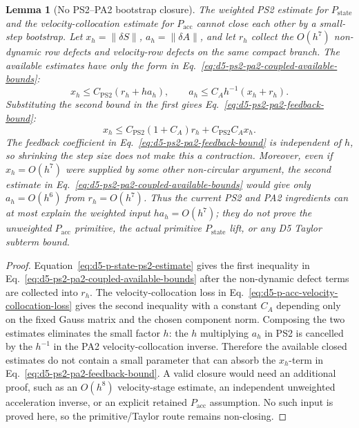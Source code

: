 \documentclass[preprint,12pt]{elsarticle}
\newtheorem{lemma}{Lemma}
\begin{document}
\begin{lemma}[No PS2--PA2 bootstrap closure]
\label{lem:d5-p-state-pacc-bootstrap-nonclosure}
The weighted PS2 estimate for \(P_{\mathrm{state}}\) and the
velocity-collocation estimate for \(P_{\mathrm{acc}}\) cannot close each
other by a small-step bootstrap.  Let
\(x_h=\|\delta S\|\), \(a_h=\|\delta A\|\), and let
\(r_h\) collect the \(O(h^7)\) non-dynamic row defects and velocity-row
defects on the same compact branch.  The available estimates have only the
form in Eq.~\eqref{eq:d5-ps2-pa2-coupled-available-bounds}:
\begin{equation}
\label{eq:d5-ps2-pa2-coupled-available-bounds}
  x_h\le C_{\mathrm{PS2}}(r_h+h a_h),
  \qquad
  a_h\le C_A h^{-1}(x_h+r_h).
\end{equation}
Substituting the second bound in the first gives
Eq.~\eqref{eq:d5-ps2-pa2-feedback-bound}:
\begin{equation}
\label{eq:d5-ps2-pa2-feedback-bound}
  x_h\le C_{\mathrm{PS2}}(1+C_A)r_h
       +C_{\mathrm{PS2}}C_A x_h .
\end{equation}
The feedback coefficient in Eq.~\eqref{eq:d5-ps2-pa2-feedback-bound} is
independent of \(h\), so shrinking the step size does not make this a
contraction.  Moreover, even if \(x_h=O(h^7)\) were supplied by some other
non-circular argument, the second estimate in
Eq.~\eqref{eq:d5-ps2-pa2-coupled-available-bounds} would give only
\(a_h=O(h^6)\) from \(r_h=O(h^7)\).  Thus the current PS2 and PA2 ingredients
can at most explain the weighted input \(h a_h=O(h^7)\); they do not prove
the unweighted \(P_{\mathrm{acc}}\) primitive, the actual primitive
\(P_{\mathrm{state}}\) lift, or any D5 Taylor subterm bound.
\end{lemma}

\begin{proof}
Equation~\eqref{eq:d5-p-state-ps2-estimate} gives the first inequality in
Eq.~\eqref{eq:d5-ps2-pa2-coupled-available-bounds} after the non-dynamic
defect terms are collected into \(r_h\).  The velocity-collocation loss in
Eq.~\eqref{eq:d5-p-acc-velocity-collocation-loss} gives the second inequality
with a constant \(C_A\) depending only on the fixed Gauss matrix and the
chosen component norm.  Composing the two estimates eliminates the small
factor \(h\): the \(h\) multiplying \(a_h\) in PS2 is cancelled by the
\(h^{-1}\) in the PA2 velocity-collocation inverse.  Therefore the available
closed estimates do not contain a small parameter that can absorb the
\(x_h\)-term in Eq.~\eqref{eq:d5-ps2-pa2-feedback-bound}.  A valid closure
would need an additional proof, such as an \(O(h^8)\) velocity-stage
estimate, an independent unweighted acceleration inverse, or an explicit
retained \(P_{\mathrm{acc}}\) assumption.  No such input is proved here, so
the primitive/Taylor route remains non-closing.
\end{proof}
\end{document}
